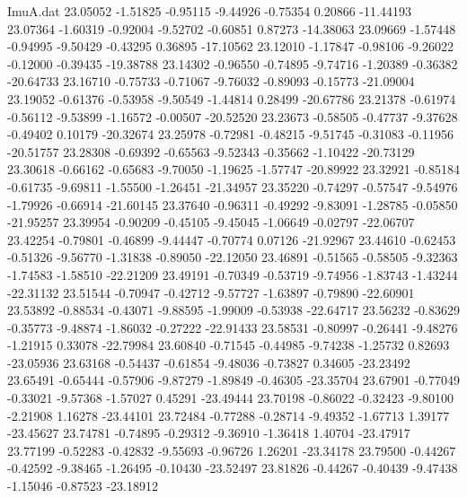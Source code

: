 \begin{filecontents}{ImuA.dat}
  23.05052   -1.51825   -0.95115   -9.44926   -0.75354    0.20866  -11.44193
  23.07364   -1.60319   -0.92004   -9.52702   -0.60851    0.87273  -14.38063
  23.09669   -1.57448   -0.94995   -9.50429   -0.43295    0.36895  -17.10562
  23.12010   -1.17847   -0.98106   -9.26022   -0.12000   -0.39435  -19.38788
  23.14302   -0.96550   -0.74895   -9.74716   -1.20389   -0.36382  -20.64733
  23.16710   -0.75733   -0.71067   -9.76032   -0.89093   -0.15773  -21.09004
  23.19052   -0.61376   -0.53958   -9.50549   -1.44814    0.28499  -20.67786
  23.21378   -0.61974   -0.56112   -9.53899   -1.16572   -0.00507  -20.52520
  23.23673   -0.58505   -0.47737   -9.37628   -0.49402    0.10179  -20.32674
  23.25978   -0.72981   -0.48215   -9.51745   -0.31083   -0.11956  -20.51757
  23.28308   -0.69392   -0.65563   -9.52343   -0.35662   -1.10422  -20.73129
  23.30618   -0.66162   -0.65683   -9.70050   -1.19625   -1.57747  -20.89922
  23.32921   -0.85184   -0.61735   -9.69811   -1.55500   -1.26451  -21.34957
  23.35220   -0.74297   -0.57547   -9.54976   -1.79926   -0.66914  -21.60145
  23.37640   -0.96311   -0.49292   -9.83091   -1.28785   -0.05850  -21.95257
  23.39954   -0.90209   -0.45105   -9.45045   -1.06649   -0.02797  -22.06707
  23.42254   -0.79801   -0.46899   -9.44447   -0.70774    0.07126  -21.92967
  23.44610   -0.62453   -0.51326   -9.56770   -1.31838   -0.89050  -22.12050
  23.46891   -0.51565   -0.58505   -9.32363   -1.74583   -1.58510  -22.21209
  23.49191   -0.70349   -0.53719   -9.74956   -1.83743   -1.43244  -22.31132
  23.51544   -0.70947   -0.42712   -9.57727   -1.63897   -0.79890  -22.60901
  23.53892   -0.88534   -0.43071   -9.88595   -1.99009   -0.53938  -22.64717
  23.56232   -0.83629   -0.35773   -9.48874   -1.86032   -0.27222  -22.91433
  23.58531   -0.80997   -0.26441   -9.48276   -1.21915    0.33078  -22.79984
  23.60840   -0.71545   -0.44985   -9.74238   -1.25732    0.82693  -23.05936
  23.63168   -0.54437   -0.61854   -9.48036   -0.73827    0.34605  -23.23492
  23.65491   -0.65444   -0.57906   -9.87279   -1.89849   -0.46305  -23.35704
  23.67901   -0.77049   -0.33021   -9.57368   -1.57027    0.45291  -23.49444
  23.70198   -0.86022   -0.32423   -9.80100   -2.21908    1.16278  -23.44101
  23.72484   -0.77288   -0.28714   -9.49352   -1.67713    1.39177  -23.45627
  23.74781   -0.74895   -0.29312   -9.36910   -1.36418    1.40704  -23.47917
  23.77199   -0.52283   -0.42832   -9.55693   -0.96726    1.26201  -23.34178
  23.79500   -0.44267   -0.42592   -9.38465   -1.26495   -0.10430  -23.52497
  23.81826   -0.44267   -0.40439   -9.47438   -1.15046   -0.87523  -23.18912

\end{filecontents}

